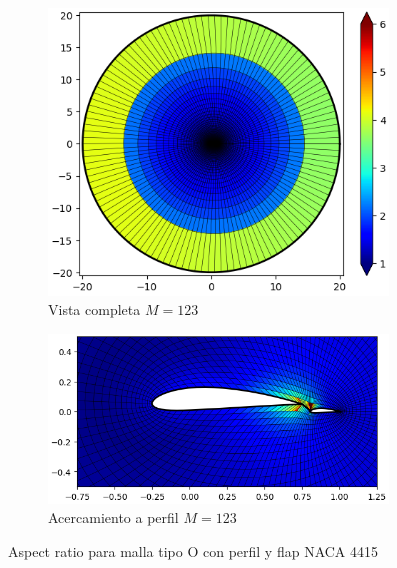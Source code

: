 \documentclass[letterpaper, openright, 12pt]{book}
\begin{document}
\begin{figure}[htbp!]
\begin{subfigure}[c]{0.48\textwidth}
            \includegraphics[keepaspectratio, width=0.99\textwidth]
                {./img/naca4415_flap_m_123_aspect_far}
            \caption{Vista completa $M = 123$}
            \label{fig:naca4415_flap_m_123_aspect_far}
        \end{subfigure}
        \hfill
        \begin{subfigure}[c]{0.48\textwidth}
            \includegraphics[keepaspectratio, width=0.99\textwidth]
                {./img/naca4415_flap_m_123_aspect_close}
            \caption{Acercamiento a perfil $M = 123$}
        \end{subfigure}
        \caption{Aspect ratio para malla tipo O con perfil y flap NACA 4415}
        \label{fig:naca4415_flap_aspect_0}
    \end{figure}
\end{document}
